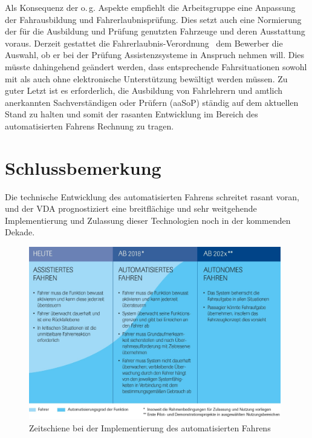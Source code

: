 \documentclass[twoside,a4paper,12pt]{article}
\begin{document}
Als Konsequenz der o.\,g. Aspekte empfiehlt die Arbeitsgruppe eine Anpassung der Fahrausbildung und Fahrerlaubnisprüfung. Dies setzt auch eine Normierung der für die
Ausbildung und Prüfung genutzten Fahrzeuge und deren Ausstattung voraus. Derzeit gestattet die Fahrerlaubnis-Verordnung~\cite{bmjv} dem Bewerber die Auswahl, ob er bei der Prüfung
Assistenzsysteme in Anspruch nehmen will. Dies müsste dahingehend geändert werden, dass entsprechende Fahrsituationen sowohl mit als auch ohne elektronische Unterstützung
bewältigt werden müssen. Zu guter Letzt ist es erforderlich, die Ausbildung von Fahrlehrern und amtlich anerkannten Sachverständigen oder Prüfern (aaSoP) ständig auf dem
aktuellen Stand zu halten und somit der rasanten Entwicklung im Bereich des automatisierten Fahrens Rechnung zu tragen.

\newpage

\cleardoublepage
\section{Schlussbemerkung}

Die technische Entwicklung des automatisierten Fahrens schreitet rasant voran, und der VDA prognostiziert eine breitflächige und sehr weitgehende Implementierung
und Zulassung dieser Technologien noch in der kommenden Dekade.\\

\begin{figure}[H]
\centering
\includegraphics[width=11cm]{resources/zeitschiene-automatisierungsgrade.jpg}
\caption[Zeitschiene bei der Implementierung des automatisierten Fahrens]{Zeitschiene bei der Implementierung des automatisierten Fahrens~\cite{vda}}
\label{figure:ZeitschieneAutomatisierungsgrade}
\end{figure}
\end{document}
